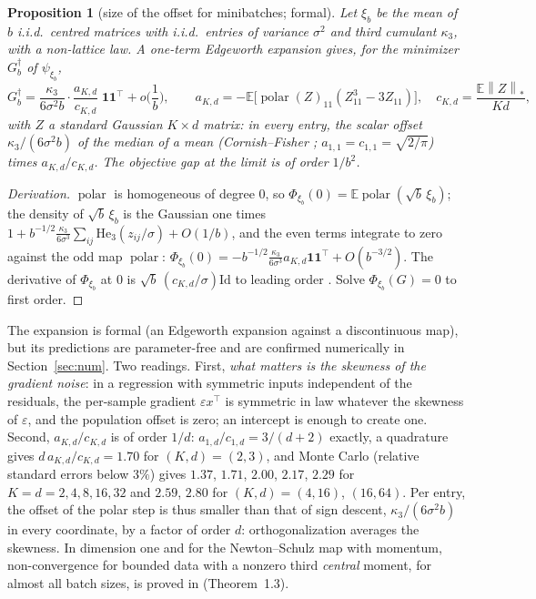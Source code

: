 \documentclass[11pt]{article}
\newtheorem{proposition}[theorem]{Proposition}
\newcommand{\E}{\mathbb{E}}
\newcommand{\nnuc}[1]{\left\|#1\right\|_{*}}
\newcommand{\polar}{\operatorname{polar}}
\newcommand{\ones}{\mathbf{1}}
\begin{document}
\begin{proposition}[size of the offset for minibatches; formal]\label{prop:offset}
Let $\xi_b$ be the mean of $b$ i.i.d.\ centred matrices with i.i.d.\ entries of variance $\sigma^2$ and third
cumulant $\kappa_3$, with a non-lattice law. A one-term Edgeworth expansion gives, for the minimizer $G_b^\dagger$ of
$\psi_{\xi_b}$,
\begin{equation}\label{eq:offset}
G_b^\dagger=\frac{\kappa_3}{6\sigma^2b}\cdot\frac{a_{K,d}}{c_{K,d}}\;\ones\ones^\top+o\Big(\frac1b\Big),\qquad
a_{K,d}=-\E\big[\polar(Z)_{11}(Z_{11}^3-3Z_{11})\big],\quad c_{K,d}=\frac{\E\nnuc Z}{Kd},
\end{equation}
with $Z$ a standard Gaussian $K\times d$ matrix: in every entry, the scalar offset $\kappa_3/(6\sigma^2b)$ of the
median of a mean (Cornish--Fisher \cite{cornish1938moments}; $a_{1,1}=c_{1,1}=\sqrt{2/\pi}$) times $a_{K,d}/c_{K,d}$.
The objective gap at the limit is of order $1/b^2$.
\end{proposition}
\begin{proof}[Derivation]
$\polar$ is homogeneous of degree $0$, so $\Phi_{\xi_b}(0)=\E\polar(\sqrt b\,\xi_b)$; the density of $\sqrt b\,\xi_b$
is the Gaussian one times $1+b^{-1/2}\frac{\kappa_3}{6\sigma^3}\sum_{ij}\mathrm{He}_3(z_{ij}/\sigma)+O(1/b)$, and the
even terms integrate to zero against the odd map $\polar$:
$\Phi_{\xi_b}(0)=-b^{-1/2}\frac{\kappa_3}{6\sigma^3}a_{K,d}\ones\ones^\top+O(b^{-3/2})$. The derivative of
$\Phi_{\xi_b}$ at $0$ is $\sqrt b\,(c_{K,d}/\sigma)\mathrm{Id}$ to leading order \cite{xie2026muon,chen2026when}.
Solve $\Phi_{\xi_b}(G)=0$ to first order.
\end{proof}

The expansion is formal (an Edgeworth expansion against a discontinuous map), but its predictions are parameter-free
and are confirmed numerically in Section~\ref{sec:num}. Two readings. First, \emph{what matters is the skewness of
the gradient noise}: in a regression with symmetric inputs independent of the residuals, the per-sample gradient
$\varepsilon x^\top$ is symmetric in law whatever the skewness of $\varepsilon$, and the population offset is zero;
an intercept is enough to create one. Second, $a_{K,d}/c_{K,d}$ is of order $1/d$: $a_{1,d}/c_{1,d}=3/(d+2)$
exactly, a quadrature gives $d\,a_{K,d}/c_{K,d}=1.70$ for $(K,d)=(2,3)$, and Monte Carlo (relative standard errors
below $3\%$) gives $1.37$, $1.71$, $2.00$, $2.17$, $2.29$ for $K=d=2,4,8,16,32$ and $2.59$, $2.80$ for
$(K,d)=(4,16)$, $(16,64)$. Per entry, the
offset of the polar step is thus smaller than that of sign descent, $\kappa_3/(6\sigma^2b)$ in every coordinate, by a
factor of order $d$: orthogonalization averages the skewness. In dimension one and for the Newton--Schulz map with
momentum, non-convergence for bounded data with a nonzero third \emph{central} moment, for almost all batch sizes, is
proved in \cite{do2026muon} (Theorem~1.3).
\end{document}
